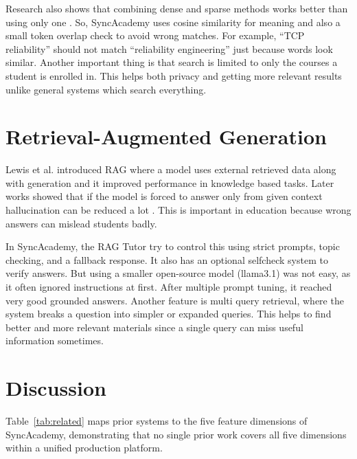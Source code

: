\documentclass[12pt,a4paper]{report}
\begin{document}
Research also shows that combining dense and sparse methods works better than using only one \cite{sparse_dense}. So, SyncAcademy uses cosine similarity for meaning and also a small token overlap check to avoid wrong matches. For example, ``TCP reliability'' should not match ``reliability engineering'' just because words look similar. Another important thing is that search is limited to only the courses a student is enrolled in. This helps both privacy and getting more relevant results unlike general systems which search everything.

\section{Retrieval-Augmented Generation}

Lewis et al. \cite{rag} introduced RAG where a model uses external retrieved data along with generation and it improved performance in knowledge based tasks. Later works showed that if the model is forced to answer only from given context hallucination can be reduced a lot \cite{replug}. This is important in education because wrong answers can mislead students badly.

In SyncAcademy, the RAG Tutor try to control this using strict prompts, topic checking, and a fallback response. It also has an optional selfcheck system to verify answers. But using a smaller open-source model (llama3.1) was not easy, as it often ignored instructions at first. After multiple prompt tuning, it reached very good grounded answers. Another feature is multi query retrieval, where the system breaks a question into simpler or expanded queries. This helps to find better and more relevant materials since a single query can miss useful information sometimes.


\section{Discussion}

Table~\ref{tab:related} maps prior systems to the five feature dimensions of SyncAcademy, demonstrating that no single prior work covers all five dimensions within a unified production platform.
\end{document}

